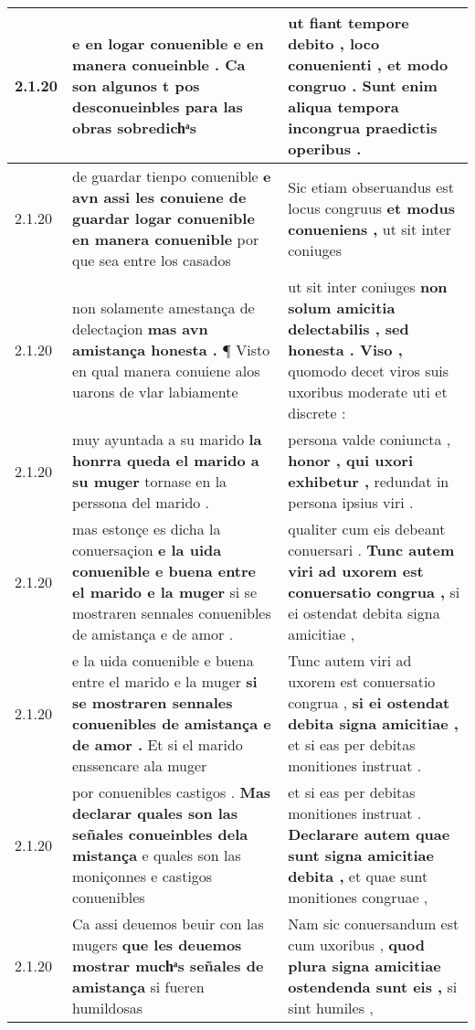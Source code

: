 \begin{tabular}{|p{1cm}|p{6.5cm}|p{6.5cm}|}
2.1.20 & e en logar conuenible \textbf{ e en manera conueinble . } Ca son algunos t pos desconueinbles para las obras sobredichͣs & ut fiant tempore debito , \textbf{ loco conuenienti , et modo congruo . } Sunt enim aliqua tempora incongrua praedictis operibus . \\\hline
2.1.20 & de guardar tienpo conuenible \textbf{ e avn assi les conuiene de guardar logar conuenible en manera conuenible } por que sea entre los casados & Sic etiam obseruandus est locus congruus \textbf{ et modus conueniens , } ut sit inter coniuges \\\hline
2.1.20 & non solamente amestança de delectaçion \textbf{ mas avn amistança honesta . } ¶ Visto en qual manera conuiene alos uarons de vlar labiamente & ut sit inter coniuges \textbf{ non solum amicitia delectabilis , sed honesta . Viso , } quomodo decet viros suis uxoribus moderate uti et discrete : \\\hline
2.1.20 & muy ayuntada a su marido \textbf{ la honrra queda el marido a su muger } tornase en la perssona del marido . & persona valde coniuncta , \textbf{ honor , qui uxori exhibetur , } redundat in persona ipsius viri . \\\hline
2.1.20 & mas estonçe es dicha la conuersaçion \textbf{ e la uida conuenible e buena entre el marido e la muger } si se mostraren sennales conuenibles de amistança e de amor . & qualiter cum eis debeant conuersari . \textbf{ Tunc autem viri ad uxorem est conuersatio congrua , } si ei ostendat debita signa amicitiae , \\\hline
2.1.20 & e la uida conuenible e buena entre el marido e la muger \textbf{ si se mostraren sennales conuenibles de amistança e de amor . } Et si el marido enssencare ala muger & Tunc autem viri ad uxorem est conuersatio congrua , \textbf{ si ei ostendat debita signa amicitiae , } et si eas per debitas monitiones instruat . \\\hline
2.1.20 & por conuenibles castigos . \textbf{ Mas declarar quales son las señales conueinbles dela mistança } e quales son las moniçonnes e castigos conuenibles & et si eas per debitas monitiones instruat . \textbf{ Declarare autem quae sunt signa amicitiae debita , } et quae sunt monitiones congruae , \\\hline
2.1.20 & Ca assi deuemos beuir con las mugers \textbf{ que les deuemos mostrar muchͣs señales de amistança } si fueren humildosas & Nam sic conuersandum est cum uxoribus , \textbf{ quod plura signa amicitiae ostendenda sunt eis , } si sint humiles , \\\hline

\end{tabular}
